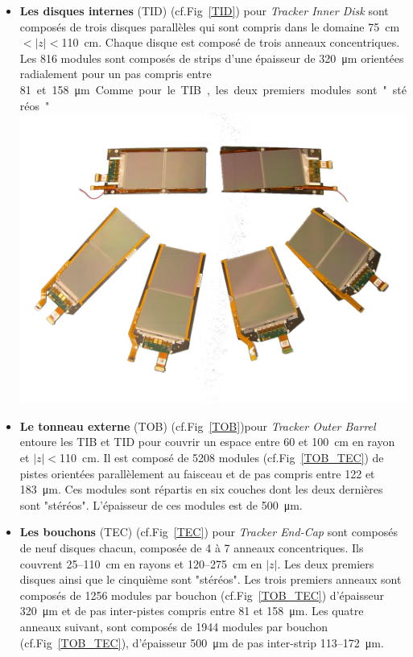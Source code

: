 \begin{itemize}[label=$\bullet$]
\item \textbf{Les disques internes} (TID) (cf.Fig~\ref{TID}) pour \textit{Tracker Inner Disk} sont composés de trois disques parallèles qui sont compris dans le domaine \SI{75}{\centi\meter}$<|z|<$\SI{110}{\centi\meter}. Chaque disque est composé de trois anneaux concentriques. Les \num{816} modules sont composés de strips d'une épaisseur de \SI{320}{\micro\meter} orientées radialement pour un pas compris entre \SI{81} et \SI{158}{\micro\meter}. Comme pour le TIB, les deux premiers modules sont "stéréos".
\marginpar
{
	\centering
	\includegraphics[width=\marginparwidth]{CMS/TOB_TEC.png}
	\label{TOB_TEC}
}
\item \textbf{Le tonneau externe } (TOB) (cf.Fig~\ref{TOB})pour \textit{Tracker Outer Barrel} entoure les TIB et TID pour couvrir un espace entre \num{60} et \SI{100}{\centi\meter} en rayon et $|z|<$\SI{110}{\centi\meter}. Il est composé de \num{5208} modules (cf.Fig~\ref{TOB_TEC}) de pistes orientées parallèlement au faisceau et de pas compris entre \num{122} et \SI{183}{\micro\meter}. Ces modules sont répartis en six couches dont les deux dernières sont "stéréos". L'épaisseur de ces modules est de \SI{500}{\micro\meter}.   

\item \textbf{Les bouchons }(TEC) (cf.Fig~\ref{TEC}) pour \textit{Tracker End-Cap} sont composés de neuf disques chacun, composée de \num{4} à \num{7} anneaux concentriques. Ils couvrent \num{25}--\SI{110}{\centi\meter} en rayons et \num{120}--\SI{275}{\centi\meter} en $|z|$. Les deux premiers disques ainsi que le cinquième sont "stéréos". Les trois premiers anneaux sont composés de \num{1256} modules par bouchon (cf.Fig~\ref{TOB_TEC}) d'épaisseur \SI{320}{\micro\meter} et de pas inter-pistes compris entre \num{81} et \SI{158}{\micro\meter}. Les quatre anneaux suivant, sont composés de \num{1944} modules par bouchon (cf.Fig~\ref{TOB_TEC}), d'épaisseur \SI{500}{\micro\meter} de pas inter-strip \num{113}--\SI{172}{\micro\meter}.
\end{itemize}

